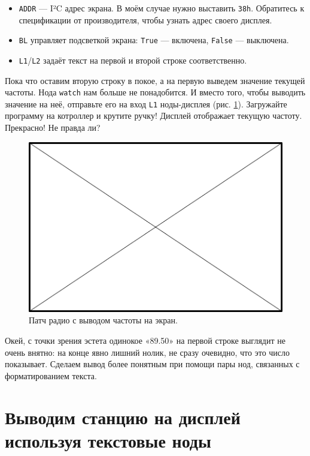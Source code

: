 \begin{itemize}
  \item \texttt{ADDR} — I²C адрес экрана. В моём случае нужно выставить \texttt{38h}. Обратитесь к спецификации от производителя, чтобы узнать адрес своего дисплея.
  \item \texttt{BL} управляет подсветкой экрана: \texttt{True} — включена, \texttt{False} — выключена.
  \item \texttt{L1}/\texttt{L2} задаёт текст на первой и второй строке соответственно.
\end{itemize}

Пока что оставим вторую строку в покое, а на первую выведем значение текущей частоты. Нода \texttt{watch} нам больше не понадобится. И вместо того, чтобы выводить значение на неё, отправьте его на вход \texttt{L1} ноды-дисплея (рис. \ref{patch:lcd-freq}). Загружайте программу на котроллер и крутите ручку! Дисплей отображает текущую частоту. Прекрасно! Не правда ли?

\begin{figure}
  \centering
  \includegraphics{TODO}
  \caption{Патч радио с выводом частоты на экран.}
  \label{patch:lcd-freq}
\end{figure}

Окей, с точки зрения эстета одинокое «89.50» на первой строке выглядит не очень внятно: на конце явно лишний нолик, не сразу очевидно, что это число показывает. Сделаем вывод более понятным при помощи пары нод, связанных с форматированием текста.

\section{Выводим станцию на дисплей используя текстовые ноды}

